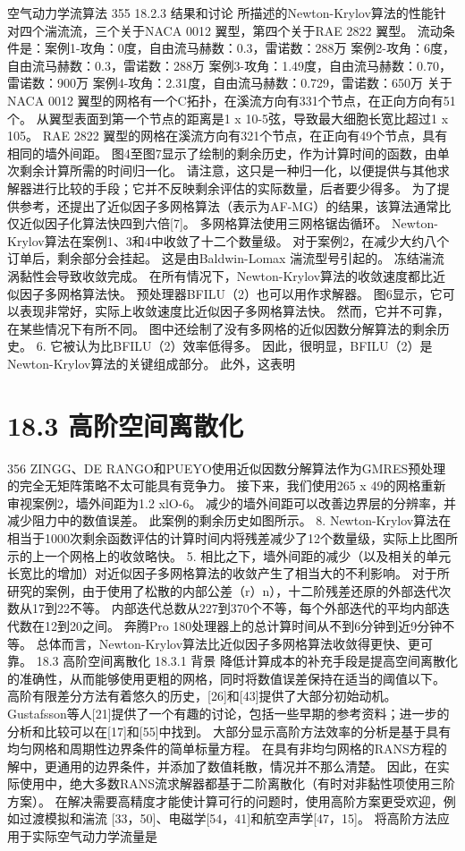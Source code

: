 \documentclass[UTF8,11pt,a4paper,openany,fontset=fandol]{ctexbook}
\begin{document}
空气动力学流算法 355 18.2.3 结果和讨论 所描述的Newton-Krylov算法的性能针对四个湍流流，三个关于NACA 0012 翼型，第四个关于RAE 2822 翼型。 流动条件是：案例1-攻角：0度，自由流马赫数：0.3，雷诺数：288万 案例2-攻角：6度，自由流马赫数：0.3，雷诺数：288万 案例3-攻角：1.49度，自由流马赫数：0.70，雷诺数：900万 案例4-攻角：2.31度，自由流马赫数：0.729，雷诺数：650万 关于NACA 0012 翼型的网格有一个C拓扑，在溪流方向有331个节点，在正向方向有51个。 从翼型表面到第一个节点的距离是1 x 10-5弦，导致最大细胞长宽比超过1 x 105。 RAE 2822 翼型的网格在溪流方向有321个节点，在正向有49个节点，具有相同的墙外间距。 图4至图7显示了绘制的剩余历史，作为计算时间的函数，由单次剩余计算所需的时间归一化。 请注意，这只是一种归一化，以便提供与其他求解器进行比较的手段；它并不反映剩余评估的实际数量，后者要少得多。 为了提供参考，还提出了近似因子多网格算法（表示为AF-MG）的结果，该算法通常比仅近似因子化算法快四到六倍[7]。 多网格算法使用三网格锯齿循环。 Newton-Krylov算法在案例1、3和4中收敛了十二个数量级。 对于案例2，在减少大约八个订单后，剩余部分会挂起。 这是由Baldwin-Lomax 湍流型号引起的。 冻结湍流 涡黏性会导致收敛完成。 在所有情况下，Newton-Krylov算法的收敛速度都比近似因子多网格算法快。 预处理器BFILU（2）也可以用作求解器。 图6显示，它可以表现非常好，实际上收敛速度比近似因子多网格算法快。 然而，它并不可靠，在某些情况下有所不同。 图中还绘制了没有多网格的近似因数分解算法的剩余历史。 6. 它被认为比BFILU（2）效率低得多。 因此，很明显，BFILU（2）是Newton-Krylov算法的关键组成部分。 此外，这表明

\section{18.3 高阶空间离散化}
356 ZINGG、DE RANGO和PUEYO使用近似因数分解算法作为GMRES预处理的完全无矩阵策略不太可能具有竞争力。 接下来，我们使用265 x 49的网格重新审视案例2，墙外间距为1.2 xlO-6。 减少的墙外间距可以改善边界层的分辨率，并减少阻力中的数值误差。 此案例的剩余历史如图所示。 8. Newton-Krylov算法在相当于1000次剩余函数评估的计算时间内将残差减少了12个数量级，实际上比图所示的上一个网格上的收敛略快。 5. 相比之下，墙外间距的减少（以及相关的单元长宽比的增加）对近似因子多网格算法的收敛产生了相当大的不利影响。 对于所研究的案例，由于使用了松散的内部公差（r）n），十二阶残差还原的外部迭代次数从17到22不等。 内部迭代总数从227到370个不等，每个外部迭代的平均内部迭代数在12到20之间。 奔腾Pro 180处理器上的总计算时间从不到6分钟到近9分钟不等。 总体而言，Newton-Krylov算法比近似因子多网格算法收敛得更快、更可靠。 18.3 高阶空间离散化 18.3.1 背景 降低计算成本的补充手段是提高空间离散化的准确性，从而能够使用更粗的网格，同时将数值误差保持在适当的阈值以下。 高阶有限差分方法有着悠久的历史，[26]和[43]提供了大部分初始动机。 Gustafsson等人[21]提供了一个有趣的讨论，包括一些早期的参考资料；进一步的分析和比较可以在[17]和[55]中找到。 大部分显示高阶方法效率的分析是基于具有均匀网格和周期性边界条件的简单标量方程。 在具有非均匀网格的RANS方程的解中，更通用的边界条件，并添加了数值耗散，情况并不那么清楚。 因此，在实际使用中，绝大多数RANS流求解器都基于二阶离散化（有时对非黏性项使用三阶方案）。 在解决需要高精度才能使计算可行的问题时，使用高阶方案更受欢迎，例如过渡模拟和湍流 [33，50]、电磁学[54，41]和航空声学[47，15]。 将高阶方法应用于实际空气动力学流量是
\end{document}
